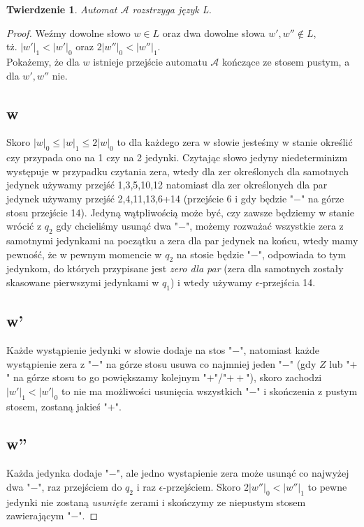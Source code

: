 \documentclass{article}
\newtheorem{theorem}{Twierdzenie}
\begin{document}
\begin{theorem}
Automat $\mathcal{A}$ rozstrzyga język L.
\end{theorem}
\begin{proof}
Weźmy dowolne słowo $w \in L$ oraz dwa dowolne słowa $w', w'' \notin L$, \\tż. $|w'|_1 < |w'|_0$ oraz $2|w''|_0 < |w''|_1$.\\
Pokażemy, że dla $w$ istnieje przejście automatu $\mathcal{A}$ kończące ze stosem pustym, a dla $w',w''$ nie.\\
\clearpage
\subsection*{w}
Skoro $|w|_0 \leq |w|_1 \leq 2|w|_0$ to dla każdego zera w słowie jesteśmy w stanie określić czy przypada ono na 1 czy na 2 jedynki. Czytając słowo jedyny niedeterminizm występuje w przypadku czytania zera, wtedy dla zer określonych dla samotnych jedynek używamy przejść 1,3,5,10,12 natomiast dla zer określonych dla par jedynek używamy przejść 2,4,11,13,6+14 (przejście 6 i gdy będzie "$-$" na górze stosu przejście 14). Jedyną wątpliwością może być, czy zawsze będziemy w stanie wrócić z $q_2$ gdy chcieliśmy usunąć dwa "$-$", możemy rozważać wszystkie zera z samotnymi jedynkami na początku a zera dla par jedynek na końcu, wtedy mamy pewność, że w pewnym momencie w $q_2$ na stosie będzie "$-$", odpowiada to tym jedynkom, do których przypisane jest \textit{zero dla par} (zera dla samotnych zostały skasowane pierwszymi jedynkami w $q_1$) i wtedy używamy $\epsilon$-przejścia 14.
\subsection*{w'}
Każde wystąpienie jedynki w słowie dodaje na stos "$-$", natomiast każde wystąpienie zera z "$-$" na górze stosu usuwa co najmniej jeden "$-$" (gdy $Z$ lub "$+$" na górze stosu to go powiększamy kolejnym "$+$"/"$++$"), skoro zachodzi $|w'|_1 < |w'|_0$ to nie ma możliwości usunięcia wszystkich "$-$" i skończenia z pustym stosem, zostaną jakieś "$+$".
\subsection*{w''}
Każda jedynka dodaje "$-$", ale jedno wystapienie zera może usunąć co najwyżej dwa "$-$", raz przejściem do $q_2$ i raz $\epsilon$-przejściem. Skoro $2|w''|_0 < |w''|_1$ to pewne jedynki nie zostaną \textit{usunięte} zerami i skończymy ze niepustym stosem zawierającym "$-$".
\end{proof}

\clearpage
\end{document}
